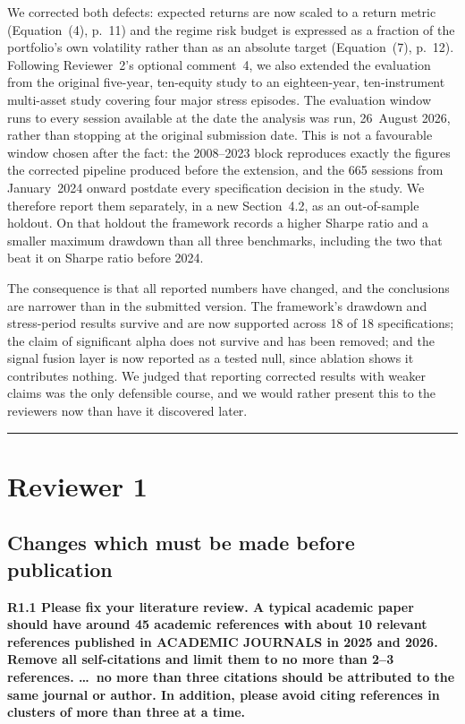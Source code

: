 \documentclass[11pt,a4paper]{article}
\newcommand{\rc}[1]{\par\medskip\noindent\textbf{#1}\par\nopagebreak}
\begin{document}
We corrected both defects: expected returns are now scaled to a return metric
(Equation~(4), p.~11) and the regime risk budget is expressed as a fraction of the
portfolio's own volatility rather than as an absolute target (Equation~(7), p.~12).
Following Reviewer~2's optional comment~4, we also extended the evaluation from the
original five-year, ten-equity study to an eighteen-year, ten-instrument multi-asset
study covering four major stress episodes. The evaluation window runs to every session
available at the date the analysis was run, 26~August 2026, rather than stopping at the
original submission date. This is not a favourable window chosen after the fact: the
2008--2023 block reproduces exactly the figures the corrected pipeline produced before
the extension, and the 665 sessions from January~2024 onward postdate every
specification decision in the study. We therefore report them separately, in a new
Section~4.2, as an out-of-sample holdout. On that holdout the framework records a higher
Sharpe ratio and a smaller maximum drawdown than all three benchmarks, including the two
that beat it on Sharpe ratio before 2024.

The consequence is that all reported numbers have changed, and the conclusions are
narrower than in the submitted version. The framework's drawdown and stress-period
results survive and are now supported across 18 of 18 specifications; the claim of
significant alpha does not survive and has been removed; and the signal fusion layer is
now reported as a tested null, since ablation shows it contributes nothing. We judged
that reporting corrected results with weaker claims was the only defensible course, and
we would rather present this to the reviewers now than have it discovered later.

\bigskip
\hrule
\section*{Reviewer 1}

\subsection*{Changes which must be made before publication}

\rc{R1.1 Please fix your literature review. A typical academic paper should have around
45 academic references with about 10 relevant references published in ACADEMIC JOURNALS
in 2025 and 2026. Remove all self-citations and limit them to no more than 2--3
references. \dots\ no more than three citations should be attributed to the same journal
or author. In addition, please avoid citing references in clusters of more than three at
a time.}
\end{document}

